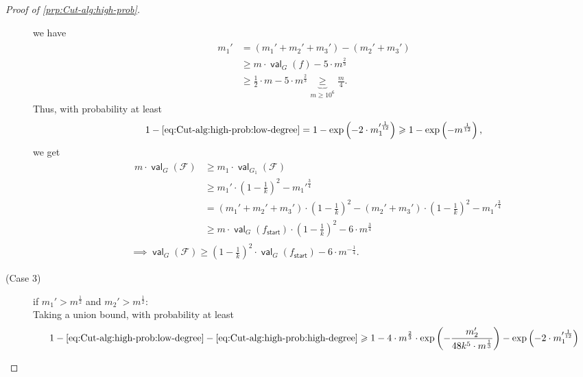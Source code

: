 \documentclass[11pt,fleqn]{article}
\renewcommand{\geq}{\geqslant}
\DeclareMathOperator{\val}{\mathsf{val}}
\newcommand{\sss}{\mathsf{start}}
\newcommand{\f}{f}
\newcommand{\sqcol}{\scrF}
\newcommand{\scrF}{\mathscr{F}}
\theoremstyle{definition}
\numberwithin{equation}{section}
\begin{document}
\begin{proof}[Proof of \cref{prp:Cut-alg:high-prob}]
\begin{description}
        we have
        \begin{align}
        \begin{aligned}
            m_1'
            & = (m_1'+m_2'+m_3') - (m_2'+m_3') \\
            & \geq m \cdot \val_G(f) - 5 \cdot m^\frac{2}{3} \\
            & \geq \tfrac{1}{2} \cdot m - 5 \cdot m^\frac{2}{3}
            \underbrace{\geq}_{m \geq 10^6} \frac{m}{4}.
        \end{aligned}
        \end{align}
        Thus, with probability at least
        \begin{align}
            1 - \text{\cref{eq:Cut-alg:high-prob:low-degree}}
            = 1 - \exp\left(-2\cdot m_1'^{\frac{1}{12}}\right)
            \geq 1 - \exp\left(- m^\frac{1}{12} \right),
        \end{align}
        we get
        \begin{align}
        &
        \begin{aligned}
            m \cdot \val_G(\sqcol)
            & \geq m_1 \cdot \val_{G_1}(\sqcol) \\
            & \geq m_1' \cdot \left(1-\tfrac{1}{k}\right)^2 - m_1'^{\frac{3}{4}} \\
            & = (m_1'+m_2'+m_3') \cdot \left(1-\tfrac{1}{k}\right)^2
                - (m_2'+m_3') \cdot \left(1-\tfrac{1}{k}\right)^2
                - m_1'^{\frac{3}{4}} \\
            & \geq m \cdot \val_G(\f_\sss) \cdot \left(1-\tfrac{1}{k}\right)^2
                - 6 \cdot m^\frac{3}{4}
        \end{aligned} \\
        & \implies \val_G(\sqcol)
            \geq \left(1-\tfrac{1}{k}\right)^2 \cdot \val_G(\f_\sss) - 6 \cdot m^{-\frac{1}{4}}.
        \end{align}
    \item[(Case 3)] if $m_1' > m^\frac{1}{2}$ and $m_2' > m^\frac{1}{2}$: \\
        Taking a union bound, with probability at least
        \begin{align}
        \begin{aligned}
            1
            - \text{\cref{eq:Cut-alg:high-prob:low-degree}}
            - \text{\cref{eq:Cut-alg:high-prob:high-degree}}
            & \geq 1
            - 4 \cdot m^{\frac{2}{3}} \cdot \exp\left(
                -\frac{m_2'}{48 k^5 \cdot m^\frac{1}{3}}
            \right)
            - \exp\left(-2\cdot m_1'^{\frac{1}{12}}\right) \\

\end{aligned}
\end{align}
\end{description}
\end{proof}
\end{document}
